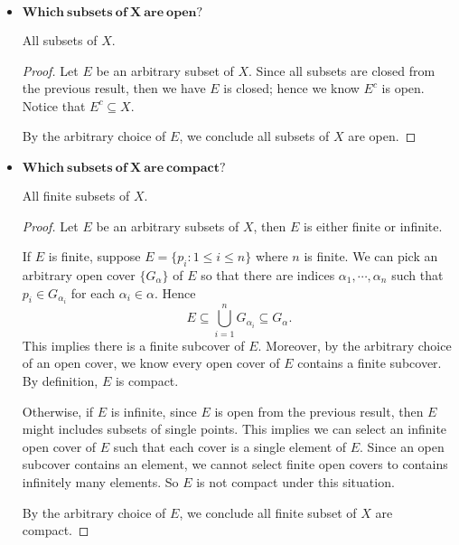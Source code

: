 \begin{Exercise}
\begin{itemize}
\begin{proof}
Pick $r = \frac{1}{2}$, then the neighborhood $N_r(p)$ only contains $p$ itself, then $p\notin E'$. By the arbitrary choice of $p$, then $E' = \emptyset$. This implies that $E'\subseteq E$ vacuously, so $E$ is closed.

By the arbitrary choice of $E$, we conclude all subsets of $X$ are closed.
\end{proof}

\item $\mathbf{Which\ subsets\ of\ X\ are\ open?}$
\begin{answer}
All subsets of $X$.
\end{answer}
\begin{proof}
Let $E$ be an arbitrary subset of $X$. Since all subsets are closed from the previous result, then we have $E$ is closed; hence we know $E^c$ is open. Notice that $E^c \subseteq X$.

By the arbitrary choice of $E$, we conclude all subsets of $X$ are open. 
\end{proof}

\item $\mathbf{Which\ subsets\ of\ X\ are\ compact?}$
\begin{answer}
All finite subsets of $X$.
\end{answer}
\begin{proof}
Let $E$ be an arbitrary subsets of $X$, then $E$ is either finite or infinite.

If $E$ is finite, suppose $E = \{p_i: 1\leq i\leq n\}$ where $n$ is finite. We can pick an arbitrary open cover $\{G_{\alpha}\}$ of $E$ so that there are indices $\alpha_{1}, \cdots, \alpha_{n}$ such that $p_i\in G_{\alpha_i}$ for each $\alpha_i\in \alpha$. Hence
$$
E \subseteq \bigcup_{i=1}^{n}G_{\alpha_i} \subseteq G_{\alpha}.
$$
This implies there is a finite subcover of $E$. Moreover, by the arbitrary choice of an open cover, we know every open cover of $E$ contains a finite subcover. By definition, $E$ is compact.

Otherwise, if $E$ is infinite, since $E$ is open from the previous result, then $E$ might includes subsets of single points. This implies we can select an infinite open cover of $E$ such that each cover is a single element of $E$. Since an open subcover contains an element, we cannot select finite open covers to contains infinitely many elements. So $E$ is not compact under this situation.

By the arbitrary choice of $E$, we conclude all finite subset of $X$ are compact.
\end{proof}
\end{itemize}
\end{Exercise}